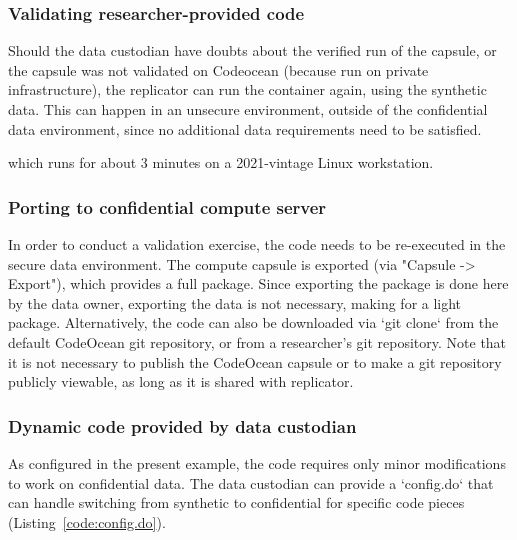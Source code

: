 \documentclass[]{hdsr}
\begin{document}
\subsubsection{Validating researcher-provided code}

Should the data custodian have doubts about the verified run of the capsule, or the capsule was not validated on Codeocean (because run on private infrastructure), the replicator can run the container again, using the synthetic data. This can happen in an unsecure environment, outside of the confidential data environment, since no additional data requirements need to be satisfied.





which runs for about 3 minutes on a 2021-vintage Linux workstation. 




\subsubsection{Porting to confidential compute server}

In order to conduct a validation exercise, the code needs to be re-executed in the secure data environment. The compute capsule is exported (via "Capsule -> Export"), which provides a full package. Since exporting the package is done here by the data owner, exporting the data is not necessary, making for a light package. Alternatively, the code can also be downloaded via `git clone` from the default CodeOcean git repository, or from a researcher's git repository. Note that it is not necessary to publish the CodeOcean capsule or to make a git repository publicly viewable, as long as it is shared with replicator.

\subsubsection{Dynamic code provided by data custodian}

As configured in the present example, the code requires only minor modifications to work on confidential data. The data custodian can provide a `config.do`  that can handle switching from synthetic to confidential for specific code pieces (Listing~\ref{code:config.do}).


\end{document}
